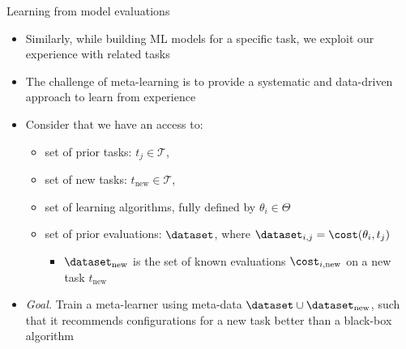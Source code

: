 \begin{frame}[c]{Learning from model evaluations}

\begin{itemize}
    \item Similarly, while building ML models for a specific task, we exploit our experience with related tasks
    \item The challenge of meta-learning is to provide a systematic and data-driven approach to learn from experience 
    \item Consider that we have an access to:
        \begin{itemize}
            \item set of prior tasks: $t_{j} \in \mathcal{T}$,
            \item set of new tasks: $t_{\text{new}} \in \mathcal{T}$,
            \item set of learning algorithms, fully defined by $\theta_{i} \in \Theta$
            \item set of prior evaluations: $\dataset$, where $\dataset_{i, j} = \cost(\theta_{i}, t_{j})$
            \begin{itemize}
                \item $\dataset_{\text{new}}$ is the set of known evaluations $\cost_{i, \text{new}}$ on a new task $t_{\text{new}}$
            \end{itemize}
        \end{itemize}
    \item \emph{Goal.} Train a meta-learner using meta-data $\dataset \cup \dataset_{\text{new}}$, such that it recommends configurations for a new task better than a black-box algorithm
\end{itemize}

\hspace{11cm}

\end{frame}

